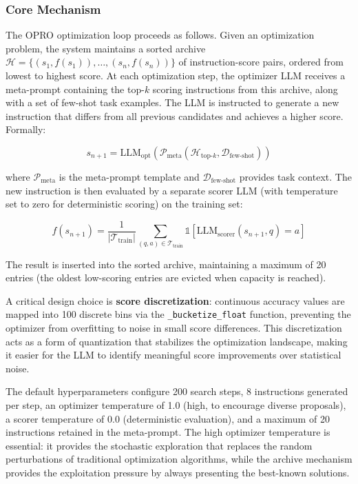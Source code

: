 \subsubsection{Core Mechanism}

The OPRO optimization loop proceeds as follows. Given an optimization problem, the system maintains a sorted archive $\mathcal{H} = \{(s_1, f(s_1)), \ldots, (s_n, f(s_n))\}$ of instruction-score pairs, ordered from lowest to highest score. At each optimization step, the optimizer LLM receives a meta-prompt containing the top-$k$ scoring instructions from this archive, along with a set of few-shot task examples. The LLM is instructed to generate a new instruction that differs from all previous candidates and achieves a higher score. Formally:

\begin{equation}
s_{n+1} = \text{LLM}_{\text{opt}}(\mathcal{P}_{\text{meta}}(\mathcal{H}_{\text{top-}k}, \mathcal{D}_{\text{few-shot}}))
\end{equation}

where $\mathcal{P}_{\text{meta}}$ is the meta-prompt template and $\mathcal{D}_{\text{few-shot}}$ provides task context. The new instruction is then evaluated by a separate scorer LLM (with temperature set to zero for deterministic scoring) on the training set:

\begin{equation}
f(s_{n+1}) = \frac{1}{|\mathcal{T}_{\text{train}}|} \sum_{(q,a) \in \mathcal{T}_{\text{train}}} \mathbb{1}[\text{LLM}_{\text{scorer}}(s_{n+1}, q) = a]
\end{equation}

The result is inserted into the sorted archive, maintaining a maximum of 20 entries (the oldest low-scoring entries are evicted when capacity is reached).

A critical design choice is \textbf{score discretization}: continuous accuracy values are mapped into 100 discrete bins via the \texttt{\_bucketize\_float} function, preventing the optimizer from overfitting to noise in small score differences. This discretization acts as a form of quantization that stabilizes the optimization landscape, making it easier for the LLM to identify meaningful score improvements over statistical noise.

The default hyperparameters configure 200 search steps, 8 instructions generated per step, an optimizer temperature of 1.0 (high, to encourage diverse proposals), a scorer temperature of 0.0 (deterministic evaluation), and a maximum of 20 instructions retained in the meta-prompt. The high optimizer temperature is essential: it provides the stochastic exploration that replaces the random perturbations of traditional optimization algorithms, while the archive mechanism provides the exploitation pressure by always presenting the best-known solutions.

